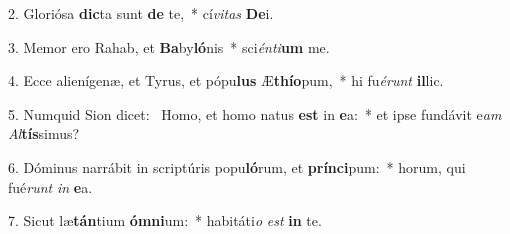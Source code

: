 2. Gloriósa \textbf{dic}ta sunt \textbf{de} te,~*  cí\textit{vi}\textit{tas} \textbf{De}i.\

3. Memor ero Rahab, et \textbf{Ba}by\textbf{ló}nis~*  sci\textit{én}\textit{ti}\textbf{um} me.\

4. Ecce alienígenæ, et Tyrus, et pópu\textbf{lus} Æ\textbf{thí}\textbf{o}pum,~*  hi fu\textit{é}\textit{runt} \textbf{il}lic.\

5. Numquid Sion dicet: \dag\  Homo, et homo natus \textbf{est} in \textbf{e}a:~*  et ipse fundávit e\textit{am} \textit{Al}\textbf{tís}simus?\

6. Dóminus narrábit in scriptúris popu\textbf{ló}rum, et \textbf{prín}\textbf{ci}pum:~*  horum, qui fué\textit{runt} \textit{in} \textbf{e}a.\

7. Sicut læ\textbf{tán}tium \textbf{óm}\textbf{ni}um:~*  habitáti\textit{o} \textit{est} \textbf{in} te.\

